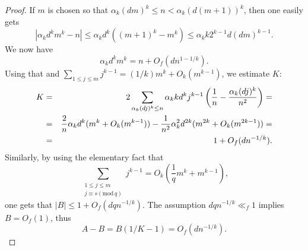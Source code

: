 \documentclass{amsart}
\numberwithin {equation}{section}
\begin{document}
\begin{proof}
If $m$ is chosen so that $\alpha _{k}(dm)^{k}\leq n<\alpha _{k}(d(m+1))^{k}$, then one easily gets 
\begin{equation*}
|\alpha _{k}d^{k}m^{k}-n|\leq \alpha _{k}d^{k}((m+1)^{k}-m^{k})\leq \alpha
_{k}k2^{k-1}d(dm)^{k-1}.
\end{equation*}We now have\begin{equation}
\alpha _{k}d^{k}m^{k}=n+O_{f}(dn^{1-1/k}).  \label{r:estimatemm}
\end{equation}Using that and $\sum_{1\leq j\leq m}j^{k-1}=(1/k)m^{k}+O_{k}(m^{k-1})$, we
estimate $K$: 
\begin{eqnarray}
K &=&2\sum_{\alpha _{k}(dj)^{k}\leq n}\alpha _{k}kd^{k}j^{k-1}\left( \frac{1}{n}-\frac{\alpha _{k}(dj)^{k}}{n^{2}}\right) =  \notag \\
&=&\frac{2}{n}\alpha _{k}d^{k}(m^{k}+O_{k}(m^{k-1}))-\frac{1}{n^{2}}\alpha
_{k}^{2}d^{2k}(m^{2k}+O_{k}(m^{2k-1}))=  \notag \\
&=&1+O_{f}(dn^{-1/k}){\text{.}}  \label{r:DD}
\end{eqnarray}Similarly, by using the elementary fact that 
\begin{equation}
\sum_{\substack{ 1\leq j\leq m  \\ j\equiv s({\mathrm{mod}}\,q)}}j^{k-1}=O_{k}\left( \frac{1}{q}m^{k}+m^{k-1}\right) {\text{,}}
\label{r:sumpol}
\end{equation}one gets that $|B|\leq 1+O_{f}(dqn^{-1/k})$. The assumption $dqn^{-1/k}\ll
_{f}1$ implies $B=O_{f}(1)$, thus 
\begin{equation}
A-B=B(1/K-1)=O_{f}(dn^{-1/k}){\text{.}}  \label{r:AB}
\end{equation}


\end{proof}
\end{document}
